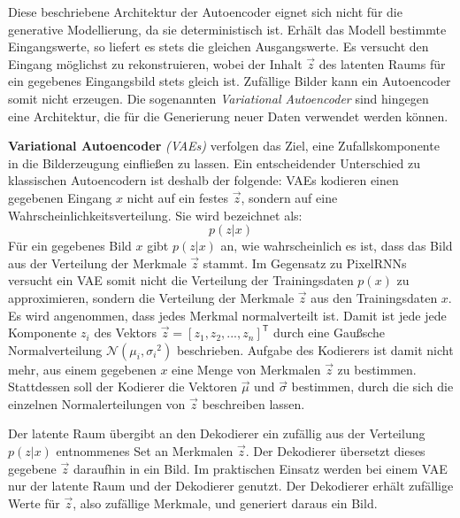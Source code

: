 Diese beschriebene Architektur der Autoencoder eignet sich nicht für die generative Modellierung, da sie deterministisch ist. Erhält das Modell bestimmte Eingangswerte, so liefert es stets die gleichen Ausgangswerte. Es versucht den Eingang möglichst zu rekonstruieren, wobei der Inhalt $\vec{z}$ des latenten Raums für ein gegebenes Eingangsbild stets gleich ist. Zufällige Bilder kann ein Autoencoder somit nicht erzeugen. Die sogenannten \emph{Variational Autoencoder} sind hingegen eine Architektur, die für die Generierung neuer Daten verwendet werden können. \cite{visualApproach} \cite{generativeModelsSurvey}

\textbf{Variational Autoencoder} \emph{(\acsp{VAE})} verfolgen das Ziel, eine Zufallskomponente in die Bilderzeugung einfließen zu lassen. Ein entscheidender Unterschied zu klassischen Autoencodern ist deshalb der folgende: \acsp{VAE} kodieren einen gegebenen Eingang $x$ nicht auf ein festes $\vec{z}$, sondern auf eine Wahrscheinlichkeitsverteilung. Sie wird bezeichnet als: \cite{autoencoders}
\begin{equation}
   p(z|x)
\end{equation}
Für ein gegebenes Bild $x$ gibt $p(z|x)$ an, wie wahrscheinlich es ist, dass das Bild aus der Verteilung der Merkmale $\vec{z}$ stammt.
Im Gegensatz zu \acp{PixelRNN} versucht ein \acs{VAE} somit nicht die Verteilung der Trainingsdaten $p(x)$ zu approximieren, sondern die Verteilung der Merkmale $\vec{z}$ aus den Trainingsdaten $x$.
Es wird angenommen, dass jedes Merkmal normalverteilt ist. Damit ist jede jede Komponente $z_{i}$ des Vektors $\vec{z} = [z_{1}, z_{2}, ..., z_{n}]^\mathsf{T}$ durch eine Gaußsche Normalverteilung $\mathcal{N}(\mu_{i}, {\sigma_{i}}^{2})$ beschrieben. Aufgabe des Kodierers ist damit nicht mehr, aus einem gegebenen $x$ eine Menge von Merkmalen $\vec{z}$ zu bestimmen. Stattdessen soll der Kodierer die Vektoren $\vec{\mu}$ und $\vec{\sigma}$ bestimmen, durch die sich die einzelnen Normalerteilungen von $\vec{z}$ beschreiben lassen. \cite{generativeModelsSurvey} \cite{autoencoders}

Der latente Raum übergibt an den Dekodierer ein zufällig aus der Verteilung $p(z|x)$ entnommenes Set an Merkmalen $\vec{z}$.
Der Dekodierer übersetzt dieses gegebene $\vec{z}$ daraufhin in ein Bild. Im praktischen Einsatz werden bei einem \acs{VAE} nur der latente Raum und der Dekodierer genutzt. Der Dekodierer erhält zufällige Werte für $\vec{z}$, also zufällige Merkmale, und generiert daraus ein Bild. \cite{autoencoders} \cite{visualApproach}

